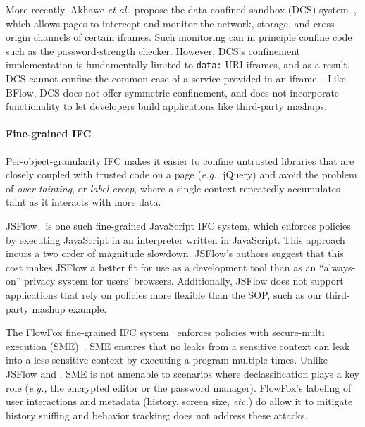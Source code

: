More recently, Akhawe \emph{et al.}~propose the data-confined sandbox
(DCS) system~\cite{Akhawe2013}, which allows pages to intercept and
monitor the network, storage, and cross-origin channels of certain
iframes.
%
Such monitoring can in principle confine code such as the
password-strength checker.
%
However, DCS's confinement implementation is fundamentally limited to
\verb|data:| URI iframes, and as a result, DCS cannot confine the
common case of a service provided in an iframe~\cite{postman}.
%
Like BFlow, DCS does not offer symmetric confinement, and does
not incorporate functionality to let developers build
applications like third-party mashups.
%

\paragraph{Fine-grained IFC}
Per-object-granularity IFC makes
it easier to confine untrusted libraries that are closely coupled with trusted
code on a page (\emph{e.g.,} jQuery) and avoid the problem of
\emph{over-tainting}, or \emph{label creep}, where a single context
repeatedly accumulates taint as it interacts with more data.

JSFlow~\cite{JSFlow} is one such fine-grained JavaScript IFC system, which
enforces policies by executing JavaScript in an interpreter written in
JavaScript.
%
This approach incurs a two order of magnitude slowdown. JSFlow's
authors suggest that this cost makes JSFlow a better fit for use as a
development tool than as an ``always-on'' privacy system for users'
browsers.
%
Additionally, JSFlow does not support applications that rely on policies
more flexible than the SOP, such as our third-party mashup example.

The FlowFox fine-grained IFC system~\cite{DeGroef:2012} enforces
policies with secure-multi execution (SME)~\cite{Devriese:2010}. SME
ensures that no leaks from a sensitive context can leak into a less
sensitive context by executing a program multiple times.
%
Unlike JSFlow and \sys{}, SME is not amenable to
scenarios where declassification plays a key role (\emph{e.g.,} the encrypted
editor or the password manager).
%
FlowFox's labeling of user interactions and metadata (history, screen
size, \emph{etc.}) do allow it to mitigate history sniffing and
behavior tracking; \sys{} does not address these attacks.

